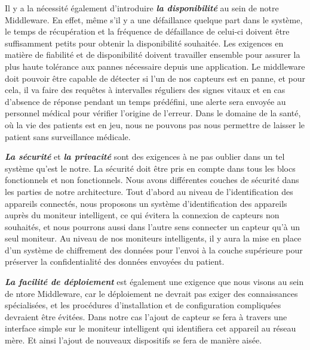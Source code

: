 Il y a la nécessité également d'introduire \textbf{\textit{la disponibilité}} au sein de notre Middleware. En effet, même s'il y a une défaillance quelque part dans le système, le temps de récupération et la fréquence de défaillance de celui-ci doivent être suffisamment petits pour obtenir la disponibilité souhaitée. Les exigences en matière de fiabilité et de disponibilité doivent travailler ensemble pour assurer la plus haute tolérance aux pannes nécessaire depuis une application. Le middleware doit pouvoir être capable de détecter si l’un de nos capteurs est en panne, et pour cela, il va faire des requêtes à intervalles réguliers des signes vitaux et en cas d’absence de réponse pendant un temps prédéfini, une alerte sera envoyée au personnel médical pour vérifier l’origine de l’erreur. Dans le domaine de la santé, où la vie des patients est en jeu, nous ne pouvons pas nous permettre de laisser le patient sans surveillance médicale.

\textbf{\textit{La sécurité}} et \textbf{\textit{la privacité}} sont des exigences à ne pas oublier dans un tel système qu'est le notre. La sécurité doit être pris en compte dans tous les blocs fonctionnels et non fonctionnels. Nous avons différentes couches de sécurité dans les parties de notre architecture. Tout d’abord au niveau de l’identification des appareils connectés, nous proposons un système d’identification des appareils auprès du moniteur intelligent, ce qui évitera la connexion de capteurs non souhaités, et nous pourrons aussi dans l’autre sens connecter un capteur qu’à un seul moniteur. Au niveau de nos moniteurs intelligents, il y aura la mise en place d’un système de chiffrement des données pour l’envoi à la couche supérieure pour préserver la confidentialité des données envoyées du patient.

\textbf{\textit{La facilité de déploiement}} est également une exigence que nous visons au sein de ntore Middleware, car le déploiement ne devrait pas exiger des connaissances spécialisées, et les procédures d'installation et de configuration compliquées devraient être évitées. Dans notre cas l’ajout de capteur se fera à travers une interface simple sur le moniteur intelligent qui identifiera cet appareil au réseau mère. Et ainsi l’ajout de nouveaux dispositifs se fera de manière aisée.